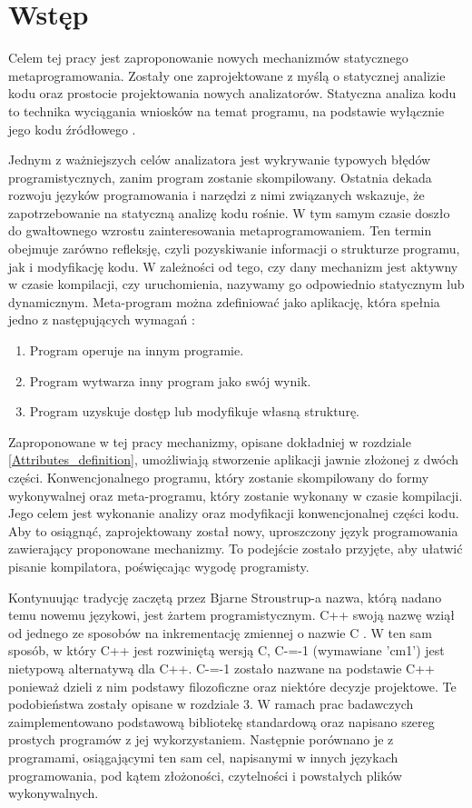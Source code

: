 \section{Wstęp}
Celem tej pracy jest zaproponowanie nowych mechanizmów statycznego 
metaprogramowania.
Zostały one zaprojektowane z myślą o statycznej analizie kodu oraz prostocie projektowania nowych analizatorów.
Statyczna analiza kodu to technika wyciągania wniosków na temat programu, na podstawie wyłącznie jego kodu źródłowego \cite{survey_of_metaprograming}.

Jednym z ważniejszych celów analizatora jest wykrywanie typowych błędów programistycznych, zanim program zostanie skompilowany.
Ostatnia dekada rozwoju języków programowania i narzędzi z nimi związanych wskazuje, że zapotrzebowanie na statyczną analizę kodu rośnie.
W tym samym czasie doszło do gwałtownego wzrostu zainteresowania metaprogramowaniem. Ten termin obejmuje zarówno refleksję, czyli pozyskiwanie informacji o strukturze programu, jak i modyfikację kodu. W zależności od tego, czy dany mechanizm jest aktywny w czasie kompilacji, czy uruchomienia, nazywamy go odpowiednio statycznym lub dynamicznym.
Meta-program można zdefiniować jako aplikację, która spełnia jedno z następujących wymagań \cite{nielson2004principles}:
\begin{enumerate}
\item Program operuje na innym programie.
\item Program wytwarza inny program jako swój wynik.
\item Program uzyskuje dostęp lub modyfikuje własną strukturę.
\end{enumerate}

Zaproponowane w tej pracy mechanizmy, opisane dokładniej w rozdziale \ref{Attributes_definition}, umożliwiają stworzenie aplikacji jawnie złożonej z dwóch części.
Konwencjonalnego programu, który zostanie skompilowany do formy wykonywalnej oraz meta-programu, który zostanie wykonany w czasie kompilacji.
Jego celem jest wykonanie analizy oraz modyfikacji konwencjonalnej części kodu.
Aby to osiągnąć, zaprojektowany został nowy, uproszczony język programowania zawierający proponowane mechanizmy. To podejście zostało przyjęte, aby ułatwić pisanie kompilatora, poświęcając wygodę programisty.

Kontynuując tradycję zaczętą przez Bjarne Stroustrup-a nazwa, którą nadano temu nowemu językowi, jest żartem programistycznym. C++ swoją nazwę wziął od jednego ze sposobów na inkrementację zmiennej o nazwie C \cite{stroustrup_com}. 
W ten sam sposób, w który C++ jest rozwiniętą wersją C, C-=-1 (wymawiane 'cm1') jest nietypową alternatywą dla C++. C-=-1 zostało nazwane na podstawie C++ ponieważ dzieli z nim podstawy filozoficzne oraz niektóre decyzje projektowe. Te podobieństwa zostały opisane w rozdziale 3.
W ramach prac badawczych zaimplementowano podstawową bibliotekę standardową oraz napisano szereg prostych programów z jej wykorzystaniem. Następnie porównano je z programami, osiągającymi ten sam cel, napisanymi w innych językach programowania, pod kątem złożoności, czytelności i powstałych plików wykonywalnych.
